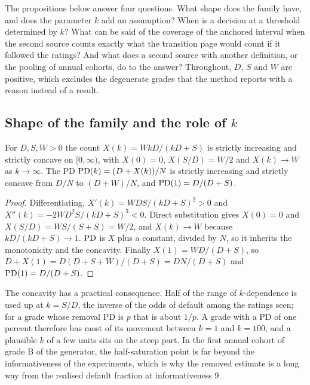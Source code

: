The propositions below answer four questions. What shape does the family have, and does the parameter $k$ add an assumption? When is a decision at a threshold determined by $k$? What can be said of the coverage of the anchored interval when the second source counts exactly what the transition page would count if it followed the \wdn{} ratings? And what does a second source with another definition, or the pooling of annual cohorts, do to the answer? Throughout, $D$, $S$ and $W$ are positive, which excludes the degenerate grades that the method reports with a reason instead of a result.

\subsection{Shape of the family and the role of $k$}

\begin{proposition}[shape]
\label{prop:shape}
For $D,S,W>0$ the count $X(k)=WkD/(kD+S)$ is strictly increasing and strictly concave on $[0,\infty)$, with $X(0)=0$, $X(S/D)=W/2$ and $X(k)\to W$ as $k\to\infty$. The PD $\mathrm{PD}(k)=(D+X(k))/N$ is strictly increasing and strictly concave from $D/N$ to $(D+W)/N$, and $\mathrm{PD}(1)=D/(D+S)$.
\end{proposition}
\begin{proof}
Differentiating, $X'(k)=WDS/(kD+S)^2>0$ and $X''(k)=-2WD^2S/(kD+S)^3<0$. Direct substitution gives $X(0)=0$ and $X(S/D)=WS/(S+S)=W/2$, and $X(k)\to W$ because $kD/(kD+S)\to1$. $\mathrm{PD}$ is $X$ plus a constant, divided by $N$, so it inherits the monotonicity and the concavity. Finally $X(1)=WD/(D+S)$, so $D+X(1)=D(D+S+W)/(D+S)=DN/(D+S)$ and $\mathrm{PD}(1)=D/(D+S)$.
\end{proof}

The concavity has a practical consequence. Half of the range of $k$-dependence is used up at $k=S/D$, the inverse of the odds of default among the ratings seen; for a grade whose removal PD is $p$ that is about $1/p$. A grade with a PD of one percent therefore has most of its movement between $k=1$ and $k=100$, and a plausible $k$ of a few units sits on the steep part. In the first annual cohort of grade B of the generator, the half-saturation point is far beyond the informativeness of the experiments, which is why the removed estimate is a long way from the realised default fraction at informativeness 9.

